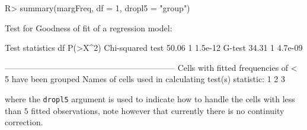 \documentclass[
]{jss}
\newcommand{\1}{\mathcal{I}} \newcommand{\bx}{\boldsymbol{x}}
\begin{document}
\begin{CodeChunk}
\begin{CodeInput}
R> summary(margFreq, df = 1, dropl5 = "group")
\end{CodeInput}
\begin{CodeOutput}
Test for Goodness of fit of a regression model:

                 Test statistics df P(>X^2)
Chi-squared test           50.06  1 1.5e-12
G-test                     34.31  1 4.7e-09

-------------------------------------------------------------- 
Cells with fitted frequencies of < 5 have been grouped 
Names of cells used in calculating test(s) statistic: 1 2 3  
\end{CodeOutput}
\end{CodeChunk}

where the \texttt{dropl5} argument is used to indicate how to handle the
cells with less than \(5\) fitted observations, note however that
currently there is no continuity correction.

\newpage


\end{document}
